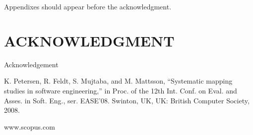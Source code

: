 \documentclass[letterpaper, 10 pt, conference]{ieeeconf}  %
\begin{document}
Appendixes should appear before the acknowledgment.

\section*{ACKNOWLEDGMENT}

Acknowledgement


\begin{thebibliography}{99}

 K. Petersen, R. Feldt, S. Mujtaba, and M. Mattsson, “Systematic mapping studies in software engineering,” in Proc. of the 12th Int. Conf. on Eval. and Asses. in Soft. Eng., ser. EASE’08. Swinton, UK, UK: British Computer Society, 2008.

 www.scopus.com









\end{thebibliography}
\end{document}
